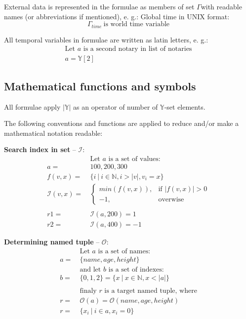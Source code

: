 \documentclass[12pt]{report}
\newcommand{\hlc}[1]{\colorbox{yellow!25}{#1}}
\begin{document}
\begin{multicols}{2}
External data is represented in the formulae as members of set $\Gamma$with readable names (or abbreviations if mentioned), e. g.: Global time in UNIX format:
\begin{equation}
\Gamma_{time} \ \text{is world time variable}
\end{equation}

All \hlc{temporal} variables in formulae are written as latin letters, e. g.:
\begin{equation}
\begin{aligned}
\text{Let } a \text{ is a second notary in list of notaries} \\
a = \mathbb{Y}[2]
\end{aligned}
\end{equation}
\end{multicols}

\subsection{Mathematical functions and symbols}
\label{tech-review-math}
All formulae apply $|\mathbb{Y}|$ as an operator of number of $\mathbb{Y}$-set elements.

The following conventions and functions are applied to reduce and/or make a mathematical notation readable:

\textbf{Search index in set} – $\mathcal{I}$:
\begin{align}
&\ \text{Let } a \text{ is a set of values: } \nonumber\\
a =&\ {100, 200, 300} \nonumber\\
f(v, x) =&\ \{i \ | \ i \in \mathbb{N},  i > |v|, v_i = x \} \\
\mathcal{I}(v, x) =&\ \begin{cases}
	min(f(v,x)), & \text{if } |f(v, x)| > 0 \\
	-1, & \text{overwise}
\end{cases}
\\
\\
r1 = &\ \mathcal{I}(a, 200) = 1\nonumber \\
r2 = &\ \mathcal{I}(a, 400) = -1
\end{align}

\textbf{\hlc{Determining} named tuple} – $\mathcal{O}$:
\begin{align}
&\ \text{Let } a \text{ is a set of names: } \nonumber\\
a =&\ \{name, age, height\} \nonumber\\
&\ \text{and let } b \text{ is a set of indexes: } \nonumber\\
b =&\ \{0, 1, 2\} = \{x \ | \ x \in \mathbb{N}, x < |a|\} \\
& \nonumber\\
&\ \text{finaly } r \text{ is a target named tuple, where} \nonumber\\
r =&\ \mathcal{O}(a) = \mathcal{O}(name, age, height) \\ 
r =&\ \{x_i \ | \ i \in  a, x_i = 0 \}
\end{align}
\end{document}

